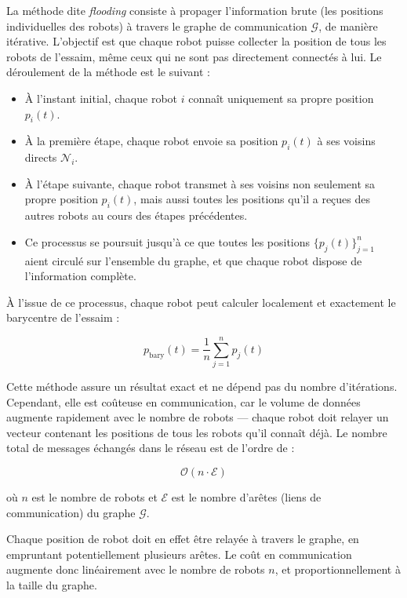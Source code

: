 La méthode dite \textit{flooding} consiste à propager l’information brute (les positions individuelles des robots) à travers le graphe de communication $\mathcal{G}$, de manière itérative.  
L'objectif est que chaque robot puisse collecter la position de tous les robots de l’essaim, même ceux qui ne sont pas directement connectés à lui.
Le déroulement de la méthode est le suivant :

\begin{itemize}
    \item À l’instant initial, chaque robot $i$ connaît uniquement sa propre position $p_i(t)$.
    \item À la première étape, chaque robot envoie sa position $p_i(t)$ à ses voisins directs $\mathcal{N}_i$.
    \item À l’étape suivante, chaque robot transmet à ses voisins non seulement sa propre position $p_i(t)$, mais aussi toutes les positions qu’il a reçues des autres robots au cours des étapes précédentes.
    \item Ce processus se poursuit jusqu’à ce que toutes les positions $\{ p_j(t) \}_{j=1}^{n}$ aient circulé sur l’ensemble du graphe, et que chaque robot dispose de l’information complète.
\end{itemize}

À l’issue de ce processus, chaque robot peut calculer localement et exactement le barycentre de l’essaim :

\begin{equation}
p_{\text{bary}}(t) = \frac{1}{n} \sum_{j=1}^{n} p_j(t)
\end{equation}

Cette méthode assure un résultat exact et ne dépend pas du nombre d’itérations.  
Cependant, elle est coûteuse en communication, car le volume de données augmente rapidement avec le nombre de robots — chaque robot doit relayer un vecteur contenant les positions de tous les robots qu’il connaît déjà.
Le nombre total de messages échangés dans le réseau est de l’ordre de :

\begin{equation}
\mathcal{O}(n \cdot \mathcal{E})
\end{equation}

où $n$ est le nombre de robots et $\mathcal{E}$ est le nombre d’arêtes (liens de communication) du graphe $\mathcal{G}$.

Chaque position de robot doit en effet être relayée à travers le graphe, en empruntant potentiellement plusieurs arêtes. Le coût en communication augmente donc linéairement avec le nombre de robots $n$, et proportionnellement à la taille du graphe.

